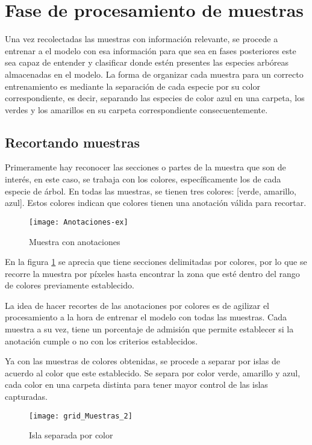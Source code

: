 \break

\section{Fase de procesamiento de muestras}
Una vez recolectadas las muestras con información relevante, se procede a  entrenar a el modelo con esa información para que sea en fases posteriores este sea capaz de entender y clasificar donde estén presentes las especies arbóreas almacenadas en el modelo. La forma de organizar cada muestra para un correcto entrenamiento es mediante la separación de cada especie por su color correspondiente, es decir, separando las especies de color azul en una carpeta, los verdes y los amarillos en su carpeta correspondiente consecuentemente.

\subsection{Recortando muestras}
Primeramente hay reconocer las secciones o partes de la muestra que son de interés, en este caso, se trabaja con los colores, específicamente los de cada especie de árbol. En todas las muestras, se tienen tres colores: [verde, amarillo, azul]. Estos colores indican que colores tienen una anotación válida para recortar.


\begin{figure}[H]
  \centering
      \texttt{[image: Anotaciones-ex]}
    \caption{Muestra con anotaciones}
    \label{Muestra con anotaciones}
\end{figure}
\clearpage

En la figura \ref{Muestra con anotaciones} se aprecia que tiene secciones delimitadas por colores, por lo que se recorre la muestra por píxeles hasta encontrar la zona que esté dentro del rango de colores previamente establecido.

La idea de hacer recortes de las anotaciones por colores es de agilizar el procesamiento a la hora de entrenar el modelo con todas las muestras. Cada muestra a su vez, tiene un porcentaje de admisión que permite establecer si la anotación cumple o no con los criterios establecidos.

Ya con las muestras de colores obtenidas, se procede a separar por islas de acuerdo al color que este establecido. Se separa por color verde, amarillo y azul, cada color en una carpeta distinta para tener mayor control de las islas capturadas.

\begin{figure}[H]
  \centering
       \texttt{[image: grid\_Muestras\_2]}
    \caption{Isla separada por color}
    \label{Isla separada por color}
\end{figure}

